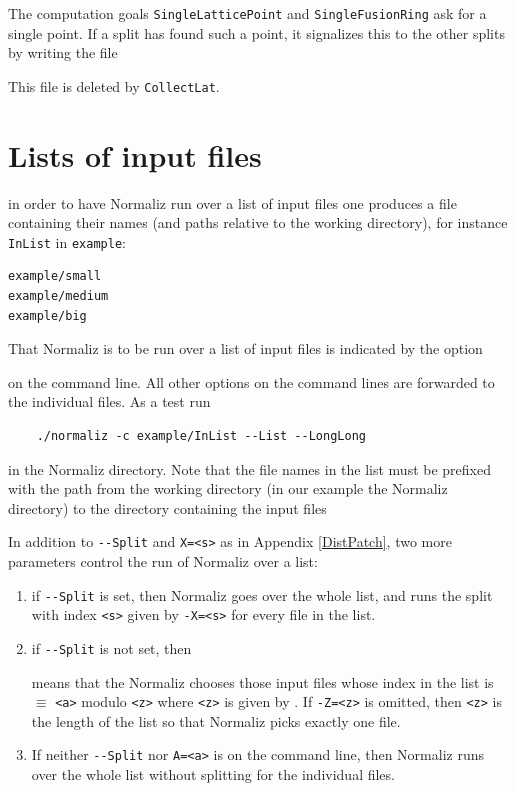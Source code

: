 The computation goals \verb*|SingleLatticePoint| and \verb*|SingleFusionRing| ask for  a single point. If a split has found such a point, it signalizes this to the other splits by writing the file
\begin{itemize}
\end{itemize}
This file is deleted by \verb*|CollectLat|.

\newpage


\section{Lists of input files}\label{input_list}

in order to have Normaliz run over a list of input files one produces a file containing  their names (and paths relative to the working directory), for instance \verb*|InList| in \verb*|example|:
\begin{Verbatim}
example/small
example/medium
example/big
\end{Verbatim}
That Normaliz is to be run over a list of input files is indicated by the option
\begin{itemize}
\end{itemize}
on the command line. All other options on the command lines are forwarded to the individual files. As a test run
\begin{Verbatim}
	./normaliz -c example/InList --List --LongLong
\end{Verbatim}
in the Normaliz directory. Note that the file names in the list must be prefixed with the path from the working directory (in our example the Normaliz directory) to the directory containing the input files 

In addition to \verb*|--Split| and \verb*|X=<s>| as in Appendix \ref{DistPatch}, two more parameters control the run of Normaliz over a list:

\begin{enumerate}
\item[(1)] if \verb*|--Split| is set, then Normaliz goes over the whole list, and runs the split with index \verb*|<s>| given by \verb*|-X=<s>| for every file in the list.

\item[(2)] if \verb*|--Split| is not set, then

\begin{itemize}
		means that the Normaliz chooses those input files   whose index in the list is $\equiv$ \verb*|<a>| modulo \verb*|<z>| where \verb*|<z>| is given by
	. If \verb*|-Z=<z>| is omitted, then \verb*|<z>| is the length of the list so that Normaliz picks exactly one file.
\end{itemize}

\item[(3)] If neither \verb*|--Split| nor \verb*|A=<a>| is on the command line, then Normaliz runs over the whole list without splitting for the individual files.
\end{enumerate}

